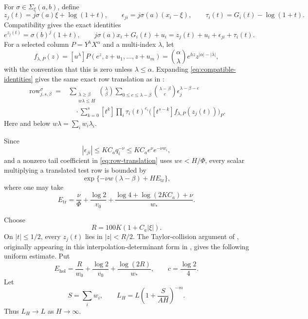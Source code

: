 \documentclass[11pt]{article}
\newcommand{\Comp}{\Sigma_{\xi}(a,b)}
\theoremstyle{definition}
\theoremstyle{remark}
\numberwithin{equation}{section}
\begin{document}
For $\sigma\in\Comp$, define
\[
 z_j(t)=j\sigma(a)\xi+\log(1+t),
 \qquad
 \epsilon_{ji}=j\sigma(a)(x_i-\xi),
 \qquad
 \tau_i(t)=G_i(t)-\log(1+t).
\]
Compatibility gives the exact identities
\begin{equation}\label{eq:compatible-identities}
 e^{z_j(t)}=\sigma(b)^j(1+t),
 \qquad
 j\sigma(a)x_i+G_i(t)+u_i
 =z_j(t)+u_i+\epsilon_{ji}+\tau_i(t).
\end{equation}
For a selected column $P=Y^hX^\alpha$ and a multi-index $\lambda$, let
\[
 f_{\lambda,P}(z)
 =[u^\lambda]P(e^z,z+u_1,\ldots,z+u_m)
 =\binom\alpha\lambda e^{hz}z^{|\alpha|-|\lambda|},
\]
with the convention that this is zero unless $\lambda\le\alpha$.
Expanding \eqref{eq:compatible-identities} gives the same exact row
translation as in \cite[Section~5.1]{LiuJiangZhang2026}:
\begin{align}\label{eq:row-translation}
 \operatorname{row}_{j,s,\beta}^{\sigma}
 ={}&\sum_{\substack{\lambda\ge\beta\\w\lambda\le H}}
 \binom\lambda\beta
 \sum_{0\le e\le\lambda-\beta}
 \binom{\lambda-\beta}{e}
 \epsilon_j^{\lambda-\beta-e}\\
 &\quad\cdot\sum_{k=0}^s
 [t^k]\prod_i\tau_i(t)^{e_i}
 \bigl([t^{s-k}]f_{\lambda,P}(z_j(t))\bigr)_P.
 \nonumber
\end{align}
Here and below $w\lambda=\sum_iw_i\lambda_i$.

Since
\[
 |\epsilon_{ji}|
 \le KC_aq_i^{-\nu}
 \le KC_ae^{\nu}e^{-\nu w_i},
\]
and a nonzero tail coefficient in \eqref{eq:row-translation} uses
$we<H/\Phi$, every scalar multiplying a translated test row is bounded
by
\begin{equation}\label{eq:translation-scalar}
 \exp\{-\nu w(\lambda-\beta)+HE_{\mathrm{tr}}\},
\end{equation}
where one may take
\begin{equation}\label{eq:Etr}
 E_{\mathrm{tr}}
 =\frac\nu\Phi+\frac{\log2}{v_0}
 +\frac{\log4+\log(2KC_a)+\nu}{w_*}.
\end{equation}

Choose
\[
 R=100K(1+C_a|\xi|).
\]
On $|t|\le1/2$, every $z_j(t)$ lies in $|z|<R/2$.  The Taylor-collision
argument of \cite[Section~5.2]{LiuJiangZhang2026}, originally appearing
in this interpolation-determinant form in \cite{Laurent2000}, gives the
following uniform estimate.  Put
\begin{equation}\label{eq:Ehol}
 E_{\mathrm{hol}}
 =\frac R{w_0}+\frac{\log2}{v_0}
  +\frac{\log(2R)}{w_*},
 \qquad c=\frac{\log2}{4}.
\end{equation}
Let
\[
 S=\sum_iw_i,
 \qquad
 L_H=L\left(1+\frac{S}{AH}\right)^{-m}.
\]
Thus $L_H\to L$ as $H\to\infty$.
\end{document}
